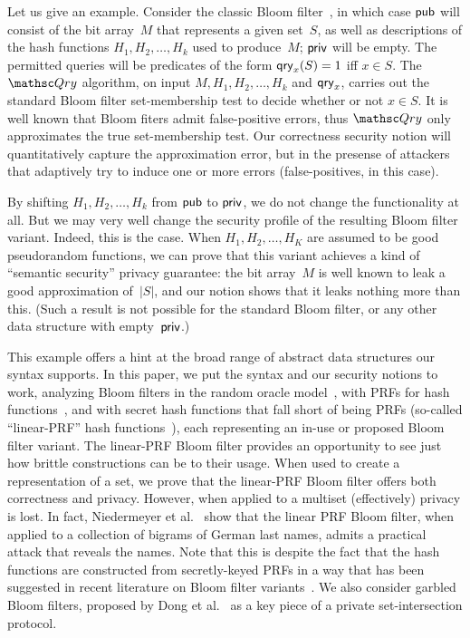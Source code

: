 Let us give an example.  Consider the classic Bloom filter~\cite{bloom1970space}, in which case ${\sf pub}$ will consist of the bit array~$M$ that represents a given set~$S$, as well as descriptions of the hash functions $H_1,H_2,\ldots,H_k$ used to produce~$M$; ${\sf priv}$ will be empty.  The permitted queries will be predicates of the form $\mathsf{qry}_x(S)=1$ iff $x \in S$. The~$\Qry$ algorithm, on input $M,H_1,H_2,\ldots,H_k$ and $\mathsf{qry}_x$, carries out the standard Bloom filter set-membership test to decide whether or not $x \in S$.  It is well known that Bloom fiters admit false-positive errors, thus $\Qry$ only approximates the true set-membership test.  Our correctness security notion will quantitatively capture the approximation error, but in the presense of attackers that adaptively try to induce one or more errors (false-positives, in this case).  

By shifting $H_1,H_2,\ldots,H_k$ from ${\sf pub}$ to ${\sf priv}$, we do not change the functionality at all.  But we may very well change the security profile of the resulting Bloom filter variant.  Indeed, this is the case.  When $H_1,H_2,\ldots,H_K$ are assumed to be good pseudorandom functions, we can prove that this variant achieves a kind of ``semantic security'' privacy guarantee: the bit array~$M$ is well known to leak a good approximation of~$|S|$, and our notion shows that it leaks nothing more than this.  (Such a result is not possible for the standard Bloom filter, or any other data structure with empty~${\sf priv}$.)

This example offers a hint at the broad range of abstract data structures our syntax supports.  In this paper, we put the syntax and our security notions to work, analyzing Bloom filters in the random oracle model~\cite{broder2004network}, with PRFs for hash functions~\cite{niedermeyer2014cryptanalysis,naor2015bloom}, and with secret hash functions that fall short of being PRFs (so-called ``linear-PRF'' hash functions~\cite{kirsch2006less,niedermeyer2014cryptanalysis}), each representing an in-use or proposed Bloom filter variant.  The linear-PRF Bloom filter provides an opportunity to see just how brittle constructions can be to their usage.  When used to create a representation of a set, we prove that the linear-PRF Bloom filter offers both correctness and privacy.  However, when applied to a multiset (effectively) privacy is lost.  In fact, Niedermeyer et al.~\cite{niedermeyer2014cryptanalysis} show that the linear PRF Bloom filter, when applied to a collection of bigrams of German last names, admits a practical attack that reveals the names.  Note that this is despite the fact that the hash functions are constructed from secretly-keyed PRFs in a way that has been suggested in recent literature on Bloom filter variants~\cite{kirsch2006less}.  We also consider garbled Bloom filters, proposed by Dong et al.~\cite{dong2013private} as a key piece of a private set-intersection protocol.

